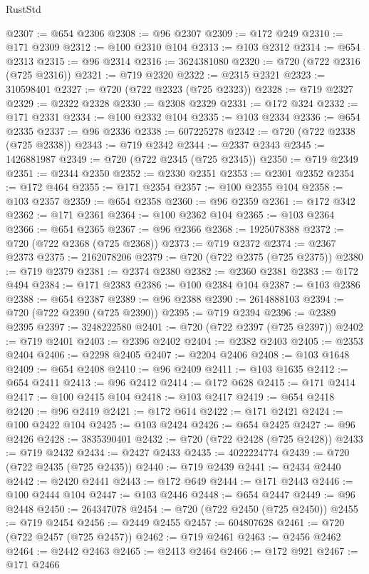 \begin{lexlean}{RustStd}
\begin{coremodule}
@2307 := @654 @2306
@2308 := @96 @2307
@2309 := @172 @249
@2310 := @171 @2309
@2312 := @100 @2310 @104
@2313 := @103 @2312
@2314 := @654 @2313
@2315 := @96 @2314
@2316 := 3624381080
@2320 := @720 (@722 @2316 (@725 @2316))
@2321 := @719 @2320
@2322 := @2315 @2321
@2323 := 310598401
@2327 := @720 (@722 @2323 (@725 @2323))
@2328 := @719 @2327
@2329 := @2322 @2328
@2330 := @2308 @2329
@2331 := @172 @324
@2332 := @171 @2331
@2334 := @100 @2332 @104
@2335 := @103 @2334
@2336 := @654 @2335
@2337 := @96 @2336
@2338 := 607225278
@2342 := @720 (@722 @2338 (@725 @2338))
@2343 := @719 @2342
@2344 := @2337 @2343
@2345 := 1426881987
@2349 := @720 (@722 @2345 (@725 @2345))
@2350 := @719 @2349
@2351 := @2344 @2350
@2352 := @2330 @2351
@2353 := @2301 @2352
@2354 := @172 @464
@2355 := @171 @2354
@2357 := @100 @2355 @104
@2358 := @103 @2357
@2359 := @654 @2358
@2360 := @96 @2359
@2361 := @172 @342
@2362 := @171 @2361
@2364 := @100 @2362 @104
@2365 := @103 @2364
@2366 := @654 @2365
@2367 := @96 @2366
@2368 := 1925078388
@2372 := @720 (@722 @2368 (@725 @2368))
@2373 := @719 @2372
@2374 := @2367 @2373
@2375 := 2162078206
@2379 := @720 (@722 @2375 (@725 @2375))
@2380 := @719 @2379
@2381 := @2374 @2380
@2382 := @2360 @2381
@2383 := @172 @494
@2384 := @171 @2383
@2386 := @100 @2384 @104
@2387 := @103 @2386
@2388 := @654 @2387
@2389 := @96 @2388
@2390 := 2614888103
@2394 := @720 (@722 @2390 (@725 @2390))
@2395 := @719 @2394
@2396 := @2389 @2395
@2397 := 3248222580
@2401 := @720 (@722 @2397 (@725 @2397))
@2402 := @719 @2401
@2403 := @2396 @2402
@2404 := @2382 @2403
@2405 := @2353 @2404
@2406 := @2298 @2405
@2407 := @2204 @2406
@2408 := @103 @1648
@2409 := @654 @2408
@2410 := @96 @2409
@2411 := @103 @1635
@2412 := @654 @2411
@2413 := @96 @2412
@2414 := @172 @628
@2415 := @171 @2414
@2417 := @100 @2415 @104
@2418 := @103 @2417
@2419 := @654 @2418
@2420 := @96 @2419
@2421 := @172 @614
@2422 := @171 @2421
@2424 := @100 @2422 @104
@2425 := @103 @2424
@2426 := @654 @2425
@2427 := @96 @2426
@2428 := 3835390401
@2432 := @720 (@722 @2428 (@725 @2428))
@2433 := @719 @2432
@2434 := @2427 @2433
@2435 := 4022224774
@2439 := @720 (@722 @2435 (@725 @2435))
@2440 := @719 @2439
@2441 := @2434 @2440
@2442 := @2420 @2441
@2443 := @172 @649
@2444 := @171 @2443
@2446 := @100 @2444 @104
@2447 := @103 @2446
@2448 := @654 @2447
@2449 := @96 @2448
@2450 := 264347078
@2454 := @720 (@722 @2450 (@725 @2450))
@2455 := @719 @2454
@2456 := @2449 @2455
@2457 := 604807628
@2461 := @720 (@722 @2457 (@725 @2457))
@2462 := @719 @2461
@2463 := @2456 @2462
@2464 := @2442 @2463
@2465 := @2413 @2464
@2466 := @172 @921
@2467 := @171 @2466

\end{coremodule}
\end{lexlean}
